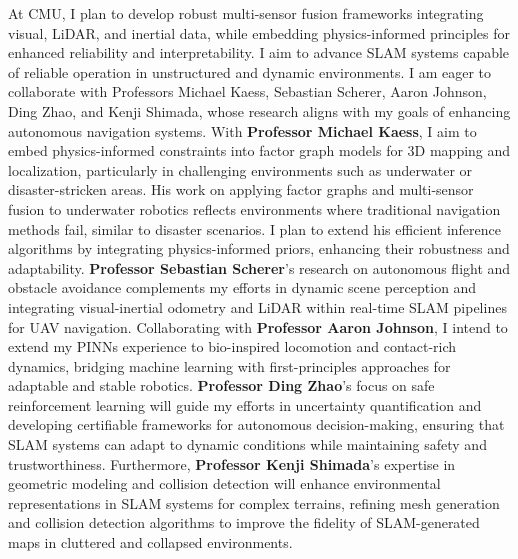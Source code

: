 \documentclass[12pt]{article}
\begin{document}
At CMU, I plan to develop robust multi-sensor fusion frameworks integrating visual, LiDAR, and inertial data, while embedding physics-informed principles for enhanced reliability and interpretability. I aim to advance SLAM systems capable of reliable operation in unstructured and dynamic environments. I am eager to collaborate with Professors Michael Kaess, Sebastian Scherer, Aaron Johnson, Ding Zhao, and Kenji Shimada, whose research aligns with my goals of enhancing autonomous navigation systems. With \textbf{Professor Michael Kaess}, I aim to embed physics-informed constraints into factor graph models for 3D mapping and localization, particularly in challenging environments such as underwater or disaster-stricken areas. His work on applying factor graphs and multi-sensor fusion to underwater robotics reflects environments where traditional navigation methods fail, similar to disaster scenarios. I plan to extend his efficient inference algorithms by integrating physics-informed priors, enhancing their robustness and adaptability. \textbf{Professor Sebastian Scherer}'s research on autonomous flight and obstacle avoidance complements my efforts in dynamic scene perception and integrating visual-inertial odometry and LiDAR within real-time SLAM pipelines for UAV navigation. Collaborating with \textbf{Professor Aaron Johnson}, I intend to extend my PINNs experience to bio-inspired locomotion and contact-rich dynamics, bridging machine learning with first-principles approaches for adaptable and stable robotics. \textbf{Professor Ding Zhao}’s focus on safe reinforcement learning will guide my efforts in uncertainty quantification and developing certifiable frameworks for autonomous decision-making, ensuring that SLAM systems can adapt to dynamic conditions while maintaining safety and trustworthiness. Furthermore, \textbf{Professor Kenji Shimada}’s expertise in geometric modeling and collision detection will enhance environmental representations in SLAM systems for complex terrains, refining mesh generation and collision detection algorithms to improve the fidelity of SLAM-generated maps in cluttered and collapsed environments.
\end{document}
